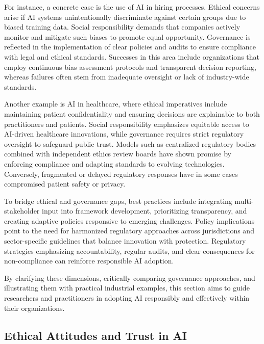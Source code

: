 \documentclass[sigconf]{acmart}
\begin{document}
For instance, a concrete case is the use of AI in hiring processes. Ethical concerns arise if AI systems unintentionally discriminate against certain groups due to biased training data. Social responsibility demands that companies actively monitor and mitigate such biases to promote equal opportunity. Governance is reflected in the implementation of clear policies and audits to ensure compliance with legal and ethical standards. Successes in this area include organizations that employ continuous bias assessment protocols and transparent decision reporting, whereas failures often stem from inadequate oversight or lack of industry-wide standards.

Another example is AI in healthcare, where ethical imperatives include maintaining patient confidentiality and ensuring decisions are explainable to both practitioners and patients. Social responsibility emphasizes equitable access to AI-driven healthcare innovations, while governance requires strict regulatory oversight to safeguard public trust. Models such as centralized regulatory bodies combined with independent ethics review boards have shown promise by enforcing compliance and adapting standards to evolving technologies. Conversely, fragmented or delayed regulatory responses have in some cases compromised patient safety or privacy.

To bridge ethical and governance gaps, best practices include integrating multi-stakeholder input into framework development, prioritizing transparency, and creating adaptive policies responsive to emerging challenges. Policy implications point to the need for harmonized regulatory approaches across jurisdictions and sector-specific guidelines that balance innovation with protection. Regulatory strategies emphasizing accountability, regular audits, and clear consequences for non-compliance can reinforce responsible AI adoption.

By clarifying these dimensions, critically comparing governance approaches, and illustrating them with practical industrial examples, this section aims to guide researchers and practitioners in adopting AI responsibly and effectively within their organizations.

\subsection{Ethical Attitudes and Trust in AI}
\end{document}
